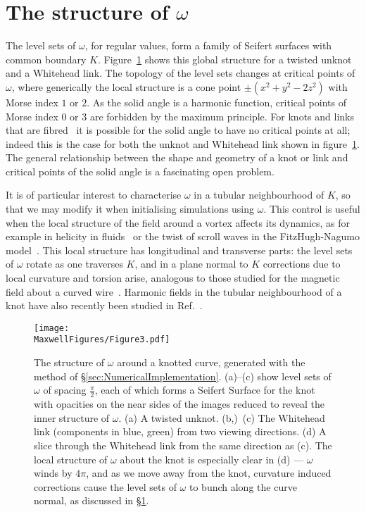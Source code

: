     \section{The structure of $\omega$}
    \label{sec:LocalStructure}

    The level sets of $\omega$, for regular values, form a family of Seifert surfaces with common boundary $K$. Figure~\ref{fig:SolidAngle} shows this global structure for a twisted unknot and a Whitehead link. 
    The topology of the level sets changes at critical points of $\omega$, where generically the local structure is a cone point $\pm(x^2+y^2-2z^2)$ with Morse index $1$ or $2$. As the solid angle is a harmonic function, critical points of Morse index $0$ or $3$ are forbidden by the maximum principle. For knots and links that are fibred~\citep{Stallings1978} it is possible for the solid angle to have no critical points at all; indeed this is the case for both the unknot and Whitehead link shown in figure~\ref{fig:SolidAngle}. The general relationship between the shape and geometry of a knot or link and critical points of the solid angle is a fascinating open problem. 

    It is of particular interest to characterise $\omega$ in a tubular neighbourhood of $K$, so that we may modify it when initialising simulations using $\omega$. This control is useful when the local structure of the field around a vortex affects its dynamics, as for example in helicity in fluids~\citep{Moffat1992} or the twist of scroll waves in the FitzHugh-Nagumo model~\citep{Winfree1984,Maucher2018}. This local structure has longitudinal and transverse parts: the level sets of $\omega$ rotate as one traverses $K$, and in a plane normal to $K$ corrections due to local curvature and torsion arise, analogous to those studied for the magnetic field about a curved wire~\citep{Saffman1992}. Harmonic fields in the tubular neighbourhood of a knot have also recently been studied in Ref.~\citep{Duan2018}. 

    \begin{figure}[htbp]
        \begin{centering}
            \texttt{[image: \\MaxwellFigures/Figure3.pdf]}
            \caption{The structure of $\omega$ around a knotted curve, generated with the method of \S\ref{sec:NumericalImplementation}. (a)--(c) show level sets of $\omega$ of spacing $\frac{\pi}{2}$, each of which forms a Seifert Surface for the knot with opacities on the near sides of the images reduced to reveal the inner structure of $\omega$. (a) A twisted unknot. (b,)~(c) The Whitehead link (components in blue, green) from two viewing directions. (d) A slice through the Whitehead link from the same direction as (c). The local structure of $\omega$ about the knot is especially clear in (d) --- $\omega$ winds by $4 \pi$, and as we move away from the knot, curvature induced corrections cause the level sets of $\omega$ to bunch along the curve normal, as discussed in \S\ref{sec:LocalStructure}.}
            \label{fig:SolidAngle}
        \end{centering}
    \end{figure}

